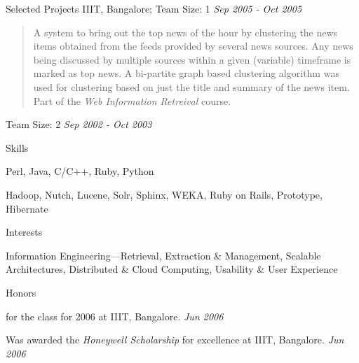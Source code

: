 \documentclass{resume}
\renewcommand{\labelcitem}{}
\newcommand{\period}{\hfill\small\sl}
\newcommand{\teamsize}{\sc\footnotesize Team Size: }
\begin{document}
\begin{category}{Selected Projects}
     IIIT, Bangalore;
    {\teamsize 1}
    {\period Sep 2005 - Oct 2005}
    \begin{quotation}
        A system to bring out the top news of the hour by clustering the news
        items obtained from the feeds provided by several news sources. Any
        news being discussed by multiple sources within a given (variable)
        timeframe is marked as top news. A bi-partite graph based clustering
        algorithm was used for clustering based on just the title and summary
        of the news item. Part of the {\em Web Information Retreival} course.
    \end{quotation}

    {\teamsize 2}
    {\period Sep 2002 - Oct 2003}
    \begin{quotation}
    \end{quotation}

\end{category}


\begin{category}{Skills}

     Perl, Java, C/C++, Ruby, Python

     Hadoop, Nutch, Lucene, Solr, Sphinx, WEKA,
    Ruby on Rails, Prototype, Hibernate

\end{category}


\begin{category}{Interests}

    \citemnobullet Information Engineering---Retrieval, Extraction \&
    Management, Scalable Architectures, Distributed \& Cloud Computing,
    Usability \& User Experience

\end{category}


\renewcommand{\labelcitem}{$\diamond$}


\begin{category}{Honors}

     for the class for 2006 at IIIT, Bangalore.
    {\period Jun 2006}

    \citembullet Was awarded the {\em Honeywell Scholarship} for excellence at IIIT,
    Bangalore.
    {\period Jun 2006}

\end{category}
\end{document}

